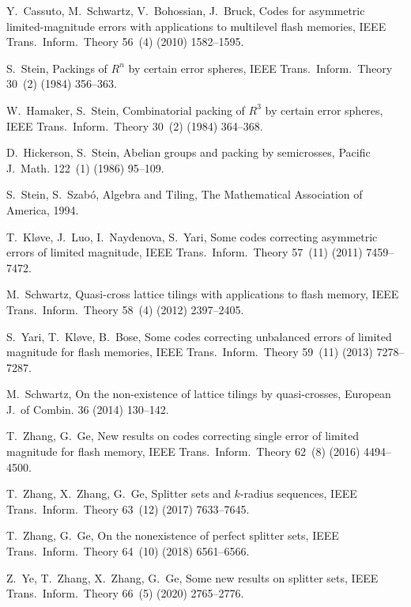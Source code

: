 \documentclass[sort&compress]{elsarticle}
\begin{document}
  
%
\begin{thebibliography}{19}

Y.~Cassuto, M.~Schwartz, V.~Bohossian, J.~Bruck, Codes for asymmetric
  limited-magnitude errors with applications to multilevel flash memories, IEEE
  Trans.~Inform.~Theory 56~(4) (2010) 1582--1595.

S.~Stein, Packings of {$R^n$} by certain error spheres, IEEE
  Trans.~Inform.~Theory 30~(2) (1984) 356--363.

W.~Hamaker, S.~Stein, Combinatorial packing of {$R^3$} by certain error
  spheres, IEEE Trans.~Inform.~Theory 30~(2) (1984) 364--368.

D.~Hickerson, S.~Stein, Abelian groups and packing by semicrosses, Pacific
  J.~Math. 122~(1) (1986) 95--109.

S.~Stein, S.~Szab{\'o}, Algebra and Tiling, The Mathematical Association of
  America, 1994.

T.~Kl{\o}ve, J.~Luo, I.~Naydenova, S.~Yari, Some codes correcting asymmetric
  errors of limited magnitude, IEEE Trans.~Inform.~Theory 57~(11) (2011)
  7459--7472.

M.~Schwartz, Quasi-cross lattice tilings with applications to flash memory,
  IEEE Trans.~Inform.~Theory 58~(4) (2012) 2397--2405.

S.~Yari, T.~Kl{\o}ve, B.~Bose, Some codes correcting unbalanced errors of
  limited magnitude for flash memories, IEEE Trans.~Inform.~Theory 59~(11)
  (2013) 7278--7287.

M.~Schwartz, On the non-existence of lattice tilings by quasi-crosses, European
  J.~of Combin. 36 (2014) 130--142.

T.~Zhang, G.~Ge, New results on codes correcting single error of limited
  magnitude for flash memory, IEEE Trans.~Inform.~Theory 62~(8) (2016)
  4494--4500.

T.~Zhang, X.~Zhang, G.~Ge, Splitter sets and {$k$}-radius sequences, IEEE
  Trans.~Inform.~Theory 63~(12) (2017) 7633--7645.

T.~Zhang, G.~Ge, On the nonexistence of perfect splitter sets, IEEE
  Trans.~Inform.~Theory 64~(10) (2018) 6561--6566.

Z.~Ye, T.~Zhang, X.~Zhang, G.~Ge, Some new results on splitter sets, IEEE
  Trans.~Inform.~Theory 66~(5) (2020) 2765--2776.


\end{thebibliography}
\end{document}
